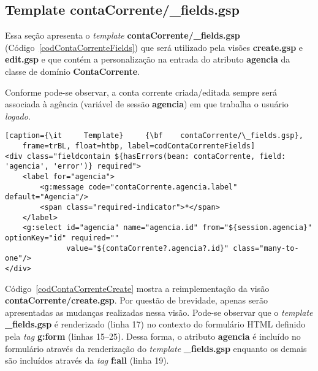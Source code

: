 \subsection{Template contaCorrente/\_fields.gsp}

\vspace{0.5cm}

Essa   seção  apresenta  o   {\it  template}   {\bf  contaCorrente/\_fields.gsp}
(Código~\ref{codContaCorrenteFields})  que  será   utilizado  pela  visões  {\bf
  create.gsp}  e {\bf  edit.gsp} e  que contém  a personalização  na  entrada do
atributo {\bf agencia} da classe de domínio {\bf ContaCorrente}.  

\vspace{0.2cm}

Conforme pode-se observar, a conta corrente criada/editada sempre será associada
à agência  (variável de  sessão {\bf  agencia}) em que  trabalha o  usuário {\it
  logado}.

\vspace{0.5cm}

\begin{lstlisting}[caption={\it     Template}     {\bf    contaCorrente/\_fields.gsp},
    frame=trBL, float=htbp, label=codContaCorrenteFields]
<div class="fieldcontain ${hasErrors(bean: contaCorrente, field: 'agencia', 'error')} required">
    <label for="agencia">
        <g:message code="contaCorrente.agencia.label" default="Agencia"/>
        <span class="required-indicator">*</span>
    </label>
    <g:select id="agencia" name="agencia.id" from="${session.agencia}" optionKey="id" required=""
              value="${contaCorrente?.agencia?.id}" class="many-to-one"/>
</div>
\end{lstlisting}

\newpage

Código~\ref{codContaCorrenteCreate}  mostra  a  reimplementação  da  visão  {\bf
  contaCorrente/create.gsp}. Por questão de brevidade, apenas serão apresentadas
as mudanças realizadas nessa visão.  Pode-se observar que  o {\it  template} {\bf
  \_fields.gsp} é renderizado (linha 17) no contexto do formulário HTML definido 
pela  {\it tag}  {\bf g:form}  (linhas 15--25).   Dessa forma,  o  atributo {\bf
  agencia} é  incluído no formulário  através da renderização do  {\it template}
{\bf \_fields.gsp}  enquanto os demais são  incluídos através da  {\it tag} {\bf
  f:all} (linha 19).  

